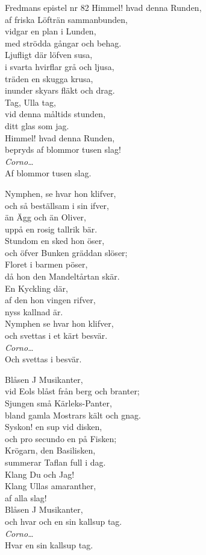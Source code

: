 \begin{song}{Fredmans epistel nr 82}
	\showversenumber
	Himmel! hvad denna Runden,\\
	af friska Löfträn sammanbunden,\\
	vidgar en plan i Lunden,\\
	med strödda gångar och behag.\\
	Ljufligt där löfven susa,\\
	i svarta hvirflar grå och ljusa,\\
	träden en skugga krusa,\\
	inunder skyars fläkt och drag.\\
	Tag, Ulla tag,\\
	vid denna måltids stunden,\\
	ditt glas som jag.\\
	Himmel! hvad denna Runden,\\
	bepryds af blommor tusen slag!\\
	\emph{Corno\ldots{}}\\
	Af blommor tusen slag.
	
	\showversenumber
	Nymphen, se hvar hon klifver,\\
	och så beställsam i sin ifver,\\
	än Ägg och än Oliver,\\
	uppå en rosig tallrik bär.\\
	Stundom en sked hon öser,\\
	och öfver Bunken gräddan slöser;\\
	Floret i barmen pöser,\\
	då hon den Mandeltårtan skär.\\
	En Kyckling där,\\
	af den hon vingen rifver,\\
	nyss kallnad är.\\
	Nymphen se hvar hon klifver,\\
	och svettas i et kärt besvär.\\
	\emph{Corno\ldots{}}\\
	Och svettas i besvär.
	
	
	\showversenumber
	Blåsen J Musikanter,\\
	vid Eols blåst från berg och branter;\\
	Sjungen små Kärleks-Panter,\\
	bland gamla Mostrars kält och gnag.\\
	Syskon! en sup vid disken,\\
	och pro secundo en på Fisken;\\
	Krögarn, den Basilisken,\\
	summerar Taflan full i dag.\\
	Klang Du och Jag!\\
	Klang Ullas amaranther,\\
	af alla slag!\\
	Blåsen J Musikanter,\\
	och hvar och en sin kallsup tag.\\
	\emph{Corno\ldots{}}\\
	Hvar en sin kallsup tag.
	

\end{song}
